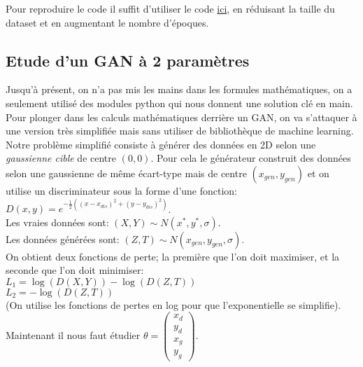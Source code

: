 \documentclass{article}
\begin{document}
Pour reproduire le code il suffit d'utiliser le code \href{/gan_on_olivetti_faces.py}{ici}, en réduisant la taille du dataset et en augmentant le nombre d'époques.

\subsection{Etude d'un GAN à 2 paramètres}
Jusqu'à présent, on n'a pas mis les mains dans les formules mathématiques, on a seulement utilisé des modules
python qui nous donnent une solution clé en main.
Pour plonger dans les calculs mathématiques derrière un GAN, on va s'attaquer à une version très simplifiée mais
sans utiliser de bibliothèque de machine learning. Notre problème simplifié consiste à générer des données en 2D selon
une \textit{gaussienne cible} de centre $(0,0)$. Pour cela le générateur construit des données selon une gaussienne
de même écart-type mais de centre $(x_{gen}, y_{gen})$ et on utilise un discriminateur sous la forme d'une fonction: 
$D(x,y) = e^{ -\frac{1}{2}((x-x_{dis})^2 + (y-y_{dis})^2) }$. \\
Les vraies données sont: $(X, Y) \sim N(x^*, y^*, \sigma)$. \\
Les données générées sont: $(Z, T) \sim N(x_{gen}, y_{gen}, \sigma)$. \\
On obtient deux fonctions de perte; la première que l'on doit maximiser, et la seconde que l'on doit minimiser: \\
$L_1 = \log(D(X,Y)) - \log(D(Z,T))$ \\
$L_2 = -\log(D(Z,T))$ \\
(On utilise les fonctions de pertes en log pour que l'exponentielle se simplifie). \\
Maintenant il nous faut étudier $ \theta = \begin{pmatrix}
x_d \\
y_d \\
x_g \\
y_g
\end{pmatrix} $.
\end{document}
